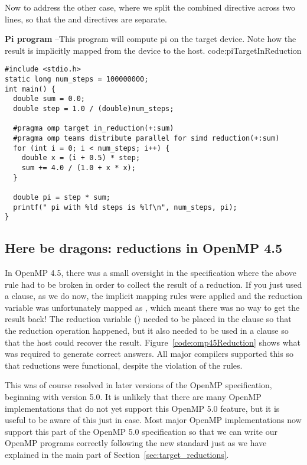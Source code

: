 Now to address the other case, where we split the combined  directive across two lines, so that the  and  directives are separate.

\begin{CodeExample}%
{\textbf{Pi program} --\small This program will compute pi on the target device.
Note how the result is implicitly mapped from the device to the host.
}%
{code:piTargetInReduction}
\begin{lstlisting}
#include <stdio.h>
static long num_steps = 100000000;
int main() {
  double sum = 0.0;
  double step = 1.0 / (double)num_steps;

  #pragma omp target in_reduction(+:sum)
  #pragma omp teams distribute parallel for simd reduction(+:sum)
  for (int i = 0; i < num_steps; i++) {
    double x = (i + 0.5) * step;
    sum += 4.0 / (1.0 + x * x);
  }

  double pi = step * sum;
  printf(" pi with %ld steps is %lf\n", num_steps, pi);
}
\end{lstlisting}
\end{CodeExample}


\subsection{Here be dragons: reductions in OpenMP 4.5}
In OpenMP 4.5, there was a small oversight in the specification where the above rule had to be broken in order to collect the result of a reduction.
If you just used a  clause, as we do now, the implicit mapping rules were applied and the reduction variable was unfortunately mapped as , which meant there was no way to get the result back!
The reduction variable () needed to be placed in the  clause so that the reduction operation happened, but it also needed to be used in a  clause so that the host could recover the result.
Figure~\ref{code:omp45Reduction} shows what was required to generate correct answers.
All major compilers supported this so that reductions were functional, despite the violation of the rules.

This was of course resolved in later versions of the OpenMP specification, beginning with version 5.0.
It is unlikely that there are many OpenMP implementations that do not yet support this OpenMP 5.0 feature, but it is useful to be aware of this just in case.
Most major OpenMP implementations now support this part of the OpenMP 5.0 specification so that we can write our OpenMP programs correctly following the new standard just as we have explained in the main part of Section~\ref{sec:target_reductions}.


